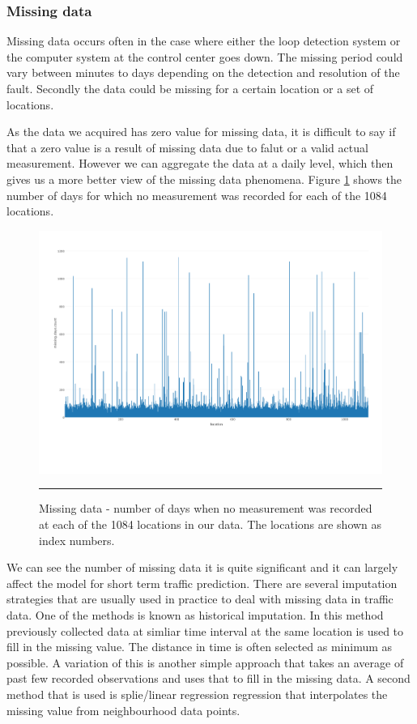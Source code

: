 \subsubsection{Missing data}
Missing data occurs often in the case where either the loop detection system or the computer system
at the control center goes down. The missing period could vary between minutes to days depending on
the detection and resolution of the fault. Secondly the data could be missing for a certain location
or a set of locations.


As the data we acquired has zero value for missing data, it is difficult to say if that a zero value
is a result of missing data due to falut or a valid actual measurement. However we can aggregate the
data at a daily level, which then gives us a more better view of the missing data phenomena. Figure
\ref{fig:missing-days-count} shows the number of days for which no measurement was recorded for each
of the 1084 locations.

\begin{figure}[htbp]
  \centering
    \includegraphics[width=\textwidth,height=\textheight,keepaspectratio]{Plots/missing-days-count.pdf}
    \rule{35em}{0.5pt}
  \caption[Missing data]{Missing data - number of days when no measurement was recorded at each of
  the 1084 locations in our data. The locations are shown as index numbers.}
  \label{fig:missing-days-count}
\end{figure}

We can see the number of missing data it is quite significant and it can largely affect the model for
short term traffic prediction. There are several imputation strategies that are usually used in practice
to deal with missing data in traffic data. One of the methods is known as historical imputation. In this
method previously collected data at simliar time interval at the same location is used to fill in the missing
value. The distance in time is often selected as minimum as possible. A variation of this is another
simple approach that takes an average of past few recorded observations and uses that to fill in
the missing data. A second method that is used is splie/linear regression regression that interpolates
the missing value from neighbourhood data points.

